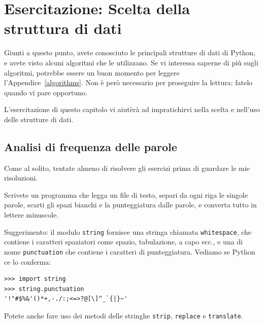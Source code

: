 \documentclass[10pt]{book}
\begin{document}
\chapter{Esercitazione: Scelta della struttura di dati}

Giunti a questo punto, avete conosciuto le principali strutture di dati di Python, e avete visto alcuni algoritmi che le utilizzano. Se vi interessa saperne di più sugli algoritmi, potrebbe essere un buon momento per leggere l'Appendice~\ref{algorithms}.
Non è però necessario per proseguire la lettura: fatelo quando vi pare opportuno.

L'esercitazione di questo capitolo vi aiutèrà ad impratichirvi nella scelta e nell'uso delle strutture di dati.

\section{Analisi di frequenza delle parole}
\label{analysis}

Come al solito, tentate almeno di risolvere gli esercizi prima di guardare le mie risoluzioni.

\vspace{0.2in}
\begin{exercise}

Scrivete un programma che legga un file di testo, separi da ogni riga le singole parole, scarti gli spazi bianchi e la punteggiatura dalle parole, e converta tutto in lettere minuscole.

Suggerimento: il modulo {\tt string} fornisce una stringa chiamata {\tt whitespace}, che contiene i caratteri spaziatori come spazio, tabulazione, a capo ecc., e una di nome {\tt punctuation} che contiene i caratteri di punteggiatura. Vediamo se Python ce lo conferma:

\begin{verbatim}
>>> import string
>>> string.punctuation
'!"#$%&'()*+,-./:;<=>?@[\]^_`{|}~'
\end{verbatim}
%
Potete anche fare uso dei metodi delle stringhe {\tt strip},
{\tt replace} e {\tt translate}.

\end{exercise}
\end{document}
